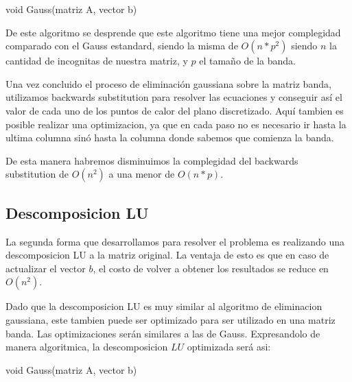 \begin{algorithm}
\begin{algorithmic}[1]\parskip=1mm
\caption{void Gauss(matriz A, vector b)}
\end{algorithmic}
\end{algorithm}

De este algoritmo se desprende que este algoritmo tiene una mejor complegidad comparado con el Gauss estandard, siendo la misma de $O(n*p^2)$ siendo $n$ la cantidad de incognitas de nuestra matriz, y $p$ el tamaño de la banda.

Una vez concluido el proceso de eliminaci\'on gaussiana sobre la matriz banda, utilizamos backwards substitution para resolver las ecuaciones y conseguir as\'i el valor de cada uno de los puntos de calor del plano discretizado. Aqu\'i tambien es posible realizar una optimizacion, ya que en cada paso no es necesario ir hasta la ultima columna sin\'o hasta la columna donde sabemos que comienza la banda.

De esta manera habremos disminuimos la complegidad del backwards substitution de $O(n^2)$ a una menor de $O(n*p)$.

\subsection{Descomposicion LU}

La segunda forma que desarrollamos para resolver el problema es realizando una descomposicion LU a la matriz original. La ventaja de esto es que en caso de actualizar el vector $b$, el costo de volver a obtener los resultados se reduce en $O(n^2)$.

Dado que la descomposicion LU es muy similar al algoritmo de eliminacion gaussiana, este tambien puede ser optimizado para ser utilizado en una matriz banda. Las optimizaciones ser\'an similares a las de Gauss. Expresandolo de manera algoritmica, la descomposicion $LU$ optimizada ser\'a asi:

\begin{algorithm}
\begin{algorithmic}[1]\parskip=1mm
\caption{void Gauss(matriz A, vector b)}
\end{algorithmic}
\end{algorithm}

